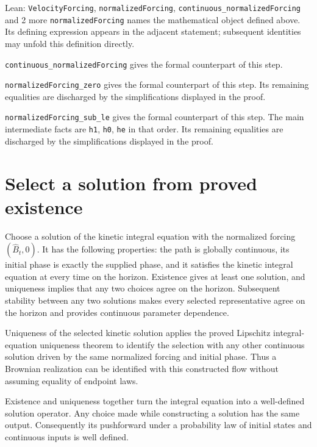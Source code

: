 \documentclass[11pt,a4paper]{article}
\begin{document}
\begin{leanbox}{Lean: \texttt{VelocityForcing}, \texttt{normalizedForcing}, \texttt{continuous\_\allowbreak{}normalizedForcing} and 2 more}
\texttt{normalized\allowbreak{}Forcing} names the mathematical object defined above. Its defining expression appears in the adjacent statement; subsequent identities may unfold this definition directly.




\texttt{continuous\_\allowbreak{}normalized\allowbreak{}Forcing} gives the formal counterpart of this step.




\texttt{normalized\allowbreak{}Forcing\_\allowbreak{}zero} gives the formal counterpart of this step. Its remaining equalities are discharged by the simplifications displayed in the proof.




\texttt{normalized\allowbreak{}Forcing\_\allowbreak{}sub\_\allowbreak{}le} gives the formal counterpart of this step. The main intermediate facts are \texttt{h1}, \texttt{h0}, \texttt{he} in that order. Its remaining equalities are discharged by the simplifications displayed in the proof.
\end{leanbox}

\section{\texorpdfstring{Select a solution from proved existence}{Select a solution from proved existence}}


Choose a solution of the kinetic integral equation with the normalized forcing \((\widehat B_t,0)\). It has the following properties: the path is globally continuous, its initial phase is exactly the supplied phase, and it satisfies the kinetic integral equation at every time on the horizon. Existence gives at least one solution, and uniqueness implies that any two choices agree on the horizon. Subsequent stability between any two solutions makes every selected representative agree on the horizon and provides continuous parameter dependence.



Uniqueness of the selected kinetic solution applies the proved Lipschitz integral-equation uniqueness theorem to identify the selection with any other continuous solution driven by the same normalized forcing and initial phase. Thus a Brownian realization can be identified with this constructed flow without assuming equality of endpoint laws.



Existence and uniqueness together turn the integral equation into a well-defined solution operator. Any choice made while constructing a solution has the same output. Consequently its pushforward under a probability law of initial states and continuous inputs is well defined.
\end{document}
